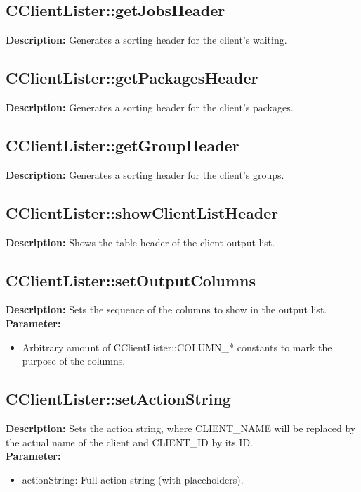 \subsection{CClientLister::getJobsHeader}
\textbf{Description:} Generates a sorting header for the client's waiting.\\

\subsection{CClientLister::getPackagesHeader}
\textbf{Description:} Generates a sorting header for the client's packages.\\

\subsection{CClientLister::getGroupHeader}
\textbf{Description:} Generates a sorting header for the client's groups.\\

\subsection{CClientLister::showClientListHeader}
\textbf{Description:} Shows the table header of the client output list.\\

\subsection{CClientLister::setOutputColumns}
\textbf{Description:} Sets the sequence of the columns to show in the output list.\\
\textbf{Parameter:}
\begin{itemize}
\item Arbitrary amount of CClientLister::COLUMN\_* constants to mark the purpose of the columns.
\end{itemize}

\subsection{CClientLister::setActionString}
\textbf{Description:} Sets the action string, where CLIENT\_NAME will be replaced by the actual name of the client and CLIENT\_ID by its ID.\\
\textbf{Parameter:}
\begin{itemize}
\item actionString: Full action string (with placeholders).
\end{itemize}

